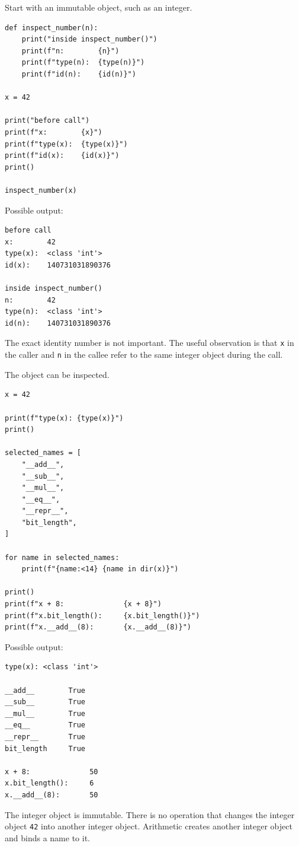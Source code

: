 Start with an immutable object, such as an integer.

\begin{verbatim}
def inspect_number(n):
    print("inside inspect_number()")
    print(f"n:        {n}")
    print(f"type(n):  {type(n)}")
    print(f"id(n):    {id(n)}")

x = 42

print("before call")
print(f"x:        {x}")
print(f"type(x):  {type(x)}")
print(f"id(x):    {id(x)}")
print()

inspect_number(x)
\end{verbatim}

Possible output:

\begin{verbatim}
before call
x:        42
type(x):  <class 'int'>
id(x):    140731031890376

inside inspect_number()
n:        42
type(n):  <class 'int'>
id(n):    140731031890376
\end{verbatim}

The exact identity number is not important. The useful observation is that \texttt{x} in the caller and \texttt{n} in the callee refer to the same integer object during the call.

The object can be inspected.

\begin{verbatim}
x = 42

print(f"type(x): {type(x)}")
print()

selected_names = [
    "__add__",
    "__sub__",
    "__mul__",
    "__eq__",
    "__repr__",
    "bit_length",
]

for name in selected_names:
    print(f"{name:<14} {name in dir(x)}")

print()
print(f"x + 8:              {x + 8}")
print(f"x.bit_length():     {x.bit_length()}")
print(f"x.__add__(8):       {x.__add__(8)}")
\end{verbatim}

Possible output:

\begin{verbatim}
type(x): <class 'int'>

__add__        True
__sub__        True
__mul__        True
__eq__         True
__repr__       True
bit_length     True

x + 8:              50
x.bit_length():     6
x.__add__(8):       50
\end{verbatim}

The integer object is immutable. There is no operation that changes the integer object \texttt{42} into another integer object. Arithmetic creates another integer object and binds a name to it.

